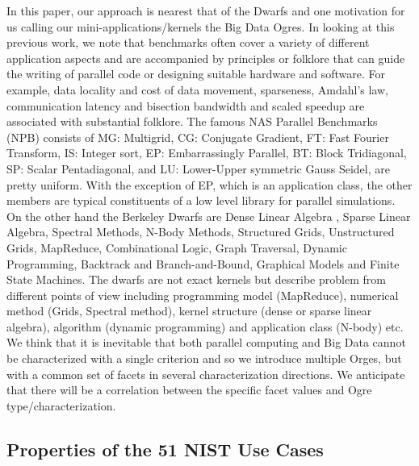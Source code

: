 \documentclass{acm_proc_article-sp}
\begin{document}
In this paper, our approach is nearest that of the Dwarfs and one motivation
for us calling our mini-applications/kernels the Big Data Ogres. In looking at
this previous work, we note that benchmarks often cover a variety of different
application aspects and are accompanied by principles or folklore that can
guide the writing of parallel code or designing suitable hardware and software.
For example, data locality and cost of data movement, sparseness, Amdahl's law,
communication latency and bisection bandwidth and scaled speedup are associated
with substantial folklore. The famous NAS Parallel Benchmarks (NPB) consists of
MG: Multigrid, CG: Conjugate Gradient, FT: Fast Fourier Transform, IS: Integer
sort, EP: Embarrassingly Parallel, BT: Block Tridiagonal, SP: Scalar
Pentadiagonal, and LU: Lower-Upper symmetric Gauss Seidel, are pretty uniform.
With the exception of EP, which is an application class, the other members are
typical constituents of a low level library for parallel simulations. On the
other hand the Berkeley Dwarfs are Dense Linear Algebra , Sparse Linear
Algebra, Spectral Methods, N-Body Methods, Structured Grids, Unstructured
Grids, MapReduce, Combinational Logic, Graph Traversal, Dynamic Programming,
Backtrack and Branch-and-Bound, Graphical Models and Finite State Machines. The
dwarfs are not exact kernels but describe problem from different points of view
including programming model (MapReduce), numerical method (Grids, Spectral
method), kernel structure (dense or sparse linear algebra), algorithm (dynamic
programming) and application class (N-body) etc. We think that it is inevitable
that both parallel computing and Big Data cannot be characterized with a single
criterion and so we introduce multiple Orges, but with a common set of facets
in several characterization directions. We anticipate that there will be a
correlation between the specific facet values and Ogre type/characterization.


\subsection{Properties of the 51 NIST Use Cases}
\end{document}

